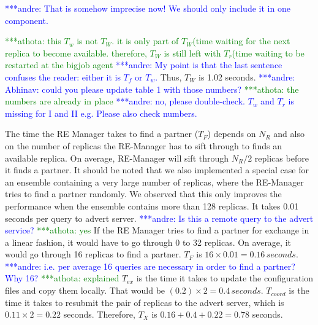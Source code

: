 \documentclass{rspublic}
\newcommand{\alnote}[1]{ {\textcolor{blue} { ***andre: #1 }}}
\newcommand{\athotanote}[1]{ {\textcolor{green} { ***athota: #1 }}}
\newcommand{\alnote}[1]{}
\newcommand{\athotanote}[1]{}
\begin{document}
\alnote{That is somehow imprecise now! We should only
include it in one component.} {\athotanote{this $T_w$ is not $T_W$. it 
is only part of $T_W$(time waiting for the next replica to become available. 
therefore, $T_W$ is still left with $T_r$(time waiting to be restarted at the bigjob agent }
\alnote{My point is that the last sentence confuses the reader: either it is $T_f$ or $T_w$.}
Thus, $T_W$ is 1.02 seconds. \alnote{Abhinav: could you please update table 1 with those numbers?} \athotanote{the numbers are already in place}\alnote{no, please double-check. $T_w$ and $T_r$ is 
missing for I and II e.g. Please also check numbers.}

The time the RE Manager takes to find a partner ($T_F$) depends on
$N_R$ and also on the number of replicas the RE-Manager has to sift
through to finds an available replica. On average, RE-Manager will
sift through $N_R/2$ replicas before it finds a partner. %
It should be noted that we also implemented a
special case for an ensemble containing a very large number of
replicas, where the RE-Manager tries to find a partner randomly. We
observed that this only improves the performance when the ensemble
contains more than 128 replicas. It takes 0.01 seconds per
query to advert server. \alnote{Is this a remote query to the advert service?} \athotanote{yes}  If the RE Manager tries to find a partner for exchange in a linear fashion, it would have to go through 0 to 32 replicas. On average, it would go through 16 replicas to find a partner. $T_F$ is $16\times
0.01=0.16\,seconds$. \alnote{i.e. per average 16 queries are necessary in
  order to find a partner? Why 16?} \athotanote{explained} $T_{ex}$ is the time it takes to
update the configuration files and copy them locally. That would be
$({0.2})\times 2=0.4\,seconds$. $T_{coord}$ is the time it takes to
resubmit the pair of replicas to the advert server, which is
$0.11\times 2 = 0.22$ seconds. Therefore, $T_{X}$ is
$0.16+0.4+0.22=0.78$ seconds. 



}
\end{document}
